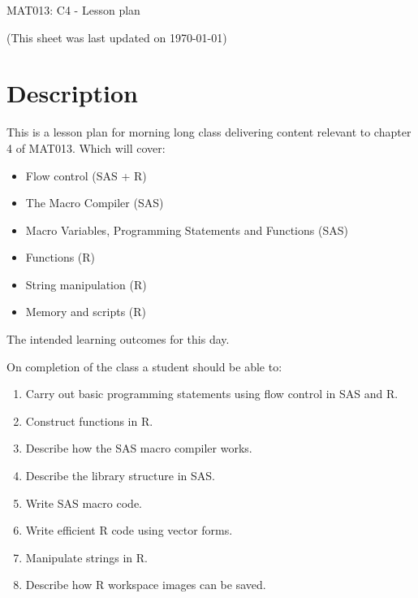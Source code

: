 \documentclass[12pt]{article}
\begin{document}
\begin{center}
\huge{MAT013: C4 - Lesson plan}
\end{center}
\begin{center}
\tiny{(This sheet was last updated on \today)}
\end{center}



\section{Description}

This is a lesson plan for morning long class delivering content relevant to chapter 4 of MAT013. Which will cover:

\begin{itemize}
\item Flow control (SAS + R)
\item The Macro Compiler (SAS)
\item Macro Variables, Programming Statements and Functions (SAS)
\item Functions (R)
\item String manipulation (R)
\item Memory and scripts (R)
\end{itemize}

The intended learning outcomes for this day.

On completion of the class a student should be able to:

\begin{enumerate}[label=\Alph*]
\item Carry out basic programming statements using flow control in SAS and R.
\item Construct functions in R.
\item Describe how the SAS macro compiler works.
\item Describe the library structure in SAS.
\item Write SAS macro code.
\item Write efficient R code using vector forms.
\item Manipulate strings in R.
\item Describe how R workspace images can be saved.
\end{enumerate}
\end{document}
